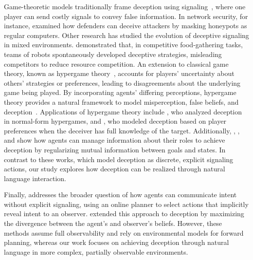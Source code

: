 Game-theoretic models traditionally frame deception using signaling~\citep{ho1978teams}, where one player can send costly signals to convey false information. 
In network security, for instance, \citet{carroll2011game} examined how defenders can deceive attackers by masking honeypots as regular computers. 
Other research has studied the evolution of deceptive signaling in mixed environments. 
\citet{floreano2007evolutionary} demonstrated that, in competitive food-gathering tasks, teams of robots spontaneously developed deceptive strategies, misleading competitors to reduce resource competition.
An extension to classical game theory, known as hypergame theory~\citep{bennett1980hypergames}, accounts for players' uncertainty about others' strategies or preferences, leading to disagreements about the underlying game being played. 
By incorporating agents' differing perceptions, hypergame theory provides a natural framework to model misperception, false beliefs, and deception~\citep{kovach2015hypergame}. 
Applications of hypergame theory include \citet{vane2002using}, who analyzed deception in normal-form hypergames, and \citet{gharesifard2013stealthy}, who modeled deception based on player preferences when the deceiver has full knowledge of the target. 
Additionally, \citet{ettinger2010theory}, \citet{strouse2018learning}, and \citet{aitchison2021learning} show how agents can manage information about their roles to achieve deception by regularizing mutual information between goals and states.
In contrast to these works, which model deception as discrete, explicit signaling actions, our study explores how deception can be realized through natural language interaction.


Finally, \citet{macnally2018action} addresses the broader question of how agents can communicate intent without explicit signaling, using an online planner to select actions that implicitly reveal intent to an observer. 
\citet{masters2017deceptive} extended this approach to deception by maximizing the divergence between the agent's and observer's beliefs. 
However, these methods assume full observability and rely on environmental models for forward planning, whereas our work focuses on achieving deception through natural language in more complex, partially observable environments.

